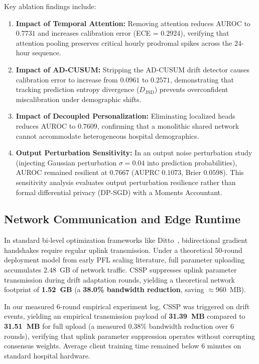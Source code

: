 \documentclass[11pt,a4paper]{article}
\begin{document}
Key ablation findings include:
\begin{enumerate}
    \item \textbf{Impact of Temporal Attention:} Removing attention reduces AUROC to $0.7731$ and increases calibration error (ECE = $0.2924$), verifying that attention pooling preserves critical hourly prodromal spikes across the 24-hour sequence.
    \item \textbf{Impact of AD-CUSUM:} Stripping the AD-CUSUM drift detector causes calibration error to increase from $0.0961$ to $0.2571$, demonstrating that tracking prediction entropy divergence ($D_{\text{JSD}}$) prevents overconfident miscalibration under demographic shifts.
    \item \textbf{Impact of Decoupled Personalization:} Eliminating localized heads reduces AUROC to $0.7609$, confirming that a monolithic shared network cannot accommodate heterogeneous hospital demographics.
    \item \textbf{Output Perturbation Sensitivity:} In an output noise perturbation study (injecting Gaussian perturbation $\sigma=0.04$ into prediction probabilities), AUROC remained resilient at $0.7667$ (AUPRC $0.1073$, Brier $0.0598$). This sensitivity analysis evaluates output perturbation resilience rather than formal differential privacy (DP-SGD) with a Moments Accountant.
\end{enumerate}

\subsection{Network Communication and Edge Runtime}
In standard bi-level optimization frameworks like Ditto~\cite{li2021ditto}, bidirectional gradient handshakes require regular uplink transmission. Under a theoretical 50-round deployment model from early PFL scaling literature, full parameter uploading accumulates $2.48$~GB of network traffic. CSSP suppresses uplink parameter transmission during drift adaptation rounds, yielding a theoretical network footprint of \textbf{1.52~GB} (a \textbf{38.0\% bandwidth reduction}, saving $\approx 960$~MB).

In our measured 6-round empirical experiment log, CSSP was triggered on drift events, yielding an empirical transmission payload of \textbf{31.39~MB} compared to \textbf{31.51~MB} for full upload (a measured $0.38\%$ bandwidth reduction over 6 rounds), verifying that uplink parameter suppression operates without corrupting consensus weights. Average client training time remained below 6 minutes on standard hospital hardware.
\end{document}
